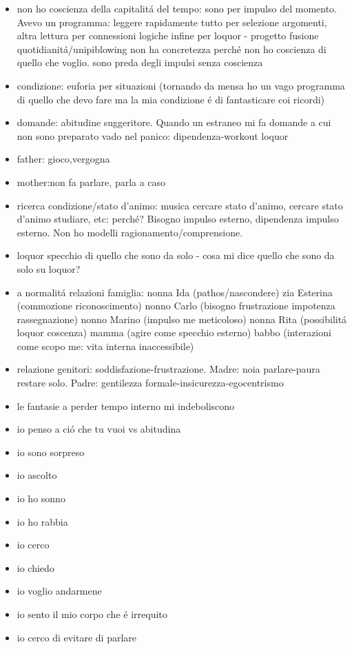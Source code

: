 \begin{itemize}
\item non ho coscienza della capitalit\'a del tempo: sono per impulso del momento. Avevo  un programma: leggere rapidamente tutto per selezione argomenti, altra lettura per connessioni logiche infine per loquor - progetto fusione quotidianit\'a/unipiblowing non ha concretezza perch\'e non ho coscienza di quello che voglio.
sono preda degli impulsi senza coscienza
\item condizione: euforia per situazioni (tornando da mensa ho un vago programma di quello che devo fare ma la mia condizione \'e di fantasticare coi ricordi)
\item domande: abitudine suggeritore. Quando un estraneo mi fa domande a cui non sono preparato vado nel panico: dipendenza-workout loquor
\item father: gioco,vergogna
\item mother:non fa parlare, parla a caso
\item ricerca condizione/stato d'animo: musica cercare stato d'animo, cercare stato d'animo studiare, etc: perch\'e? Bisogno impulso esterno, dipendenza impulso esterno. Non ho modelli ragionamento/comprensione.
\item loquor specchio di quello che sono da solo - cosa mi dice quello che sono da solo su loquor?
\item a normalit\'a relazioni famiglia: nonna Ida (pathos/nascondere) zia Esterina (commozione riconoscimento) nonno Carlo (bisogno frustrazione impotenza rassegnazione) nonno Marino (impulso me meticoloso) nonna Rita (possibilit\'a loquor coscenza) mamma (agire come specchio esterno) babbo (interazioni come scopo me: vita interna inaccessibile)
\item relazione genitori: soddisfazione-frustrazione.
Madre: noia parlare-paura restare solo.
Padre: gentilezza formale-insicurezza-egocentrismo
\item le fantasie a perder tempo interno mi indeboliscono
\item io penso a ci\'o che tu vuoi vs abitudina
\item io sono sorpreso
\item io ascolto 
\item io ho sonno
\item io ho rabbia
\item io cerco
\item io chiedo
\item io voglio andarmene
\item io sento il mio corpo che \'e irrequito
\item io cerco di evitare di parlare
\end{itemize}

